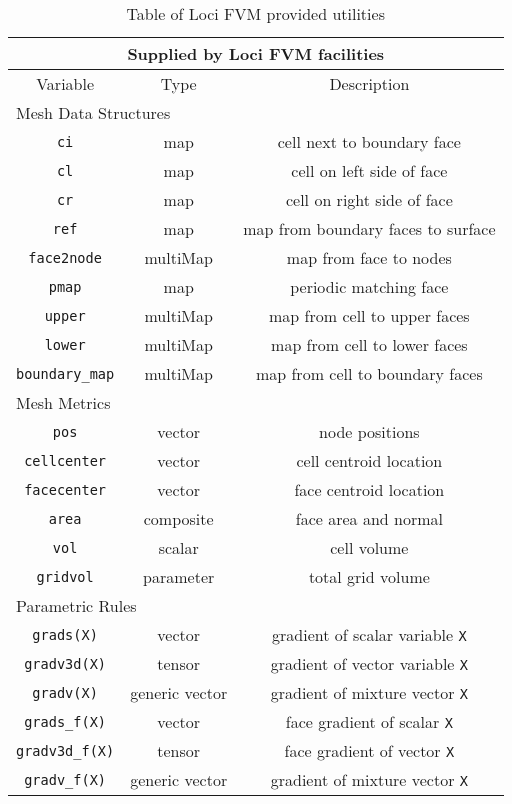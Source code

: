 \documentclass[letterpaper,twoside]{article}
\begin{document}
\begin{table}
\begin{center}
\caption{Table of Loci FVM provided utilities}
\label{tab:LociFacilities}
\begin{tabular}{|c|c|c|}
\hline
\multicolumn{3}{|c|}{ Supplied by Loci FVM facilities}\\
\hline
Variable & Type & Description\\
\hline\hline
\multicolumn{3}{|l|}{Mesh Data Structures}\\
\hline
{\tt ci} & map & cell next to boundary face\\
{\tt cl} & map & cell on left side of face\\
{\tt cr} & map & cell on right side of face\\
{\tt ref} & map & map from boundary faces to surface\\
{\tt face2node} & multiMap & map from face to nodes\\
{\tt pmap} & map & periodic matching face\\
{\tt upper} & multiMap & map from cell to upper faces\\
{\tt lower} & multiMap & map from cell to lower faces\\
{\tt boundary\_map} &multiMap & map from cell to boundary faces\\
\hline
\multicolumn{3}{|l|}{Mesh Metrics}\\
\hline
{\tt pos} & vector & node positions\\
{\tt cellcenter} & vector & cell centroid location\\
{\tt facecenter} & vector & face centroid location\\
{\tt area} & composite & face area and normal\\
{\tt vol} & scalar & cell volume\\
{\tt gridvol} & parameter & total grid volume\\
\hline
\multicolumn{3}{|l|}{Parametric Rules}\\
\hline
{\tt grads(X)} & vector & gradient of scalar variable {\tt X}\\
{\tt gradv3d(X)} & tensor & gradient of vector variable {\tt X}\\
{\tt gradv(X)} & generic vector & gradient of mixture vector {\tt X}\\
{\tt grads\_f(X)} & vector & face gradient of scalar {\tt X}\\
{\tt gradv3d\_f(X)} & tensor & face gradient of vector {\tt X}\\
{\tt gradv\_f(X)} & generic vector & gradient of mixture vector {\tt X}\\

\end{tabular}
\end{center}
\end{table}
\end{document}
